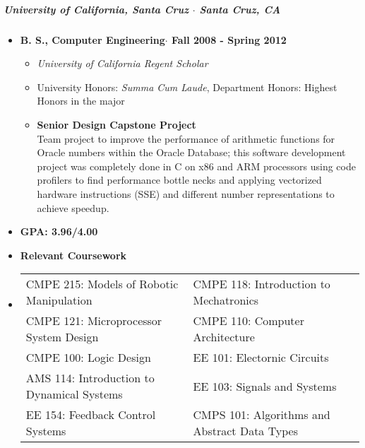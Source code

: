 \documentclass[10pt,letterpaper]{article}
\begin{document}
\subparagraph{University of California, Santa Cruz $\cdot$ Santa Cruz, CA }
\begin{itemize}
    \item {\bf B. S., Computer Engineering$\cdot$ Fall 2008 - Spring 2012}
    \begin{itemize}
		\item {\em University of California Regent Scholar} 
		\item University Honors: {\em Summa Cum Laude}, Department Honors: Highest Honors in the major

        \item {\bf Senior Design Capstone Project}\\
        Team project to improve the performance of arithmetic functions for Oracle numbers within the Oracle Database; this software development project was completely done in C on x86 and ARM processors using code profilers to find performance bottle necks and applying vectorized hardware instructions (SSE) and different number representations to achieve speedup. 
    \end{itemize}
\end{itemize}

\begin{itemize}
    \item {\bf GPA: 3.96/4.00 }
    \item {\bf Relevant Coursework}
    \item
    \begin{tabularx}{\textwidth}{l l}
        CMPE 215: Models of Robotic Manipulation 
        & \hfill CMPE 118: Introduction to Mechatronics \\
        CMPE 121: Microprocessor System Design 
        & \hfill CMPE 110: Computer Architecture \\
        CMPE 100: Logic Design 
        & \hfill EE 101: Electornic Circuits \\
         AMS 114: Introduction to Dynamical Systems 
        & \hfill EE 103: Signals and Systems \\
        EE 154: Feedback Control Systems 
        & \hfill CMPS 101: Algorithms and Abstract Data Types\\
    \end{tabularx}
\end{itemize}


\end{document}
